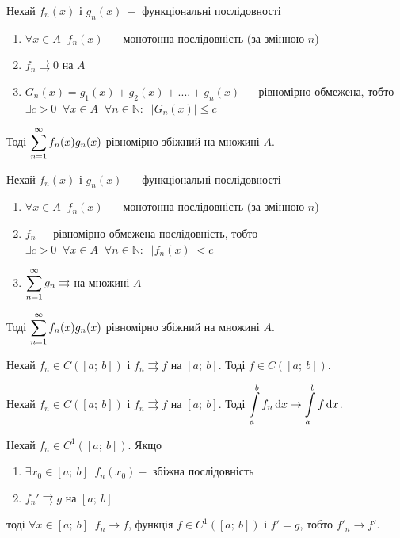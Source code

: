 \begin{theorem} 
Нехай $f_n(x)$ і $g_n(x) \: -$ функціональні послідовності 
       \begin{enumerate}
           \item $\forall x \in A \; \;f_n(x) \: - $ монотонна послідовність (за змінною $n$)
           \item $f_n \rightrightarrows 0 $ на $A$
           \item $G_n(x) = g_1(x) + g_2(x) +....+ g_n(x) \: - \ $рівномірно обмежена, тобто $\exists c > 0 \;\; \forall x \in A \;\; \forall n \in \mathbb{N}: \;\; \left| G_n(x) \right| \leqslant  c$
       \end{enumerate}
Тоді $\displaystyle\sum\limits_{n=1}^{\infty} f_n(x)  g_n(x) $ рівномірно збіжний на множині $A$.

\end{theorem} 
\begin{theorem} 
Нехай $f_n(x)$ і $g_n(x) \: -$ функціональні послідовності 
       \begin{enumerate}
           \item $\forall x \in A \; \;f_n(x) \: - $ монотонна послідовність (за змінною $n$)
           \item $f_n - $ рівномірно обмежена послідовність, тобто $\exists c > 0 \;\; \forall x \in A \;\; \forall n \in \mathbb{N}: \;\; \left| f_n(x) \right| < c$
           \item  $\displaystyle\sum\limits_{n=1}^{\infty} g_n \rightrightarrows $ на множині $A$
       \end{enumerate}
Тоді $\displaystyle\sum\limits_{n=1}^{\infty} f_n(x)  g_n(x) $ рівномірно збіжний на множині $A$.

\end{theorem} 
\begin{theorem} 
\end{theorem} 
Нехай $f_n \in C([a; \: b])$ і $f_n \rightrightarrows f$ на $[a; \:b]$. Тоді $f \in C([a; \: b])$.

\begin{theorem} 

\end{theorem} 
Нехай $f_n \in C([a; \: b])$ і $f_n \rightrightarrows f$ на $[a; \:b]$. Тоді $\displaystyle\int\limits_a^b f_n  \, \mathrm{d}x \rightarrow \displaystyle\int\limits_a^b f \, \mathrm{d}x $.
\begin{theorem} 
Нехай $f_n \in C^1([a; \: b])$. Якщо
       \begin{enumerate}
           \item $\exists x_0 \in [a; \: b] \; \;f_n(x_0) - $ збіжна послідовність
           \item $f_n' \rightrightarrows g $ на $[a; \: b]$
       \end{enumerate}
тоді $\forall x \in [a; \: b]\;\; f_n \rightarrow f$, функція $f \in C^1([a; \: b])$ і $f' = g$, тобто $f'_n \rightarrow f'$.
\end{theorem} 

